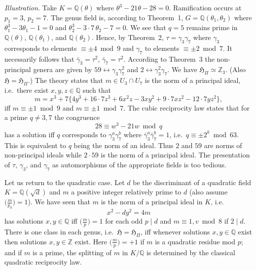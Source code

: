 \medskip\noindent
\emph{Illustration.} Take $K=\mathbb{Q}(\theta)$ where
$\theta^{3}-21\theta-28=0$. Ramification occurs at $p_{1}=3$,
$p_{2}=7$. The genus field is, according to Theorem~1,
$G=\mathbb{Q}(\theta_{1},\theta_{2})$ where $\theta_{1}^{3}-3\theta_{1}-1=0$
and $\theta_{2}^{3}-3\cdot 7\,\theta_{2}-7=0$. We see that $q=5$ remains
prime in $\mathbb{Q}(\theta)$, $\mathbb{Q}(\theta_{1})$, and
$\mathbb{Q}(\theta_{2})$. Hence, by Theorem~2, $\tau=\gamma_{3}\gamma_{7}$
where $\gamma_{3}$ corresponds to elements $\equiv\pm 4\bmod 9$ and
$\gamma_{7}$ to elements $\equiv\pm 2\bmod 7$. It necessarily follows
that $\bar{\gamma}_{3}=\tau^{2}$, $\bar{\gamma}_{7}=\tau^{2}$. According
to Theorem~3 the non-principal genera are given by
$59\leftrightarrow\gamma_{3}\gamma_{7}^{2}$ and
$2\leftrightarrow\gamma_{3}^{2}\gamma_{7}$. We have
$\mathfrak{H}_{\Pi}\simeq\mathbb{Z}_{3}$. (Also
$\mathfrak{H}=\mathfrak{H}_{\Pi}$.) The theory states that $m\in U_{3}\cap U_{7}$ is
the norm of a principal ideal, i.e.\ there exist $x,y,z\in\mathbb{Q}$
such that
\[
m=x^{3}+7\bigl\{4y^{3}+16\cdot 7z^{3}+6x^{2}z-3xy^{2}
+9\cdot 7xz^{2}-12\cdot 7yz^{2}\bigr\},
\]
iff $m\equiv\pm 1\bmod 9$ and $m\equiv\pm 1\bmod 7$. The cubic
reciprocity law states that for a prime $q\neq 3,7$ the congruence
\[
28\equiv w^{3}-21w\bmod q
\]
has a solution iff $q$ corresponds to $\gamma_{3}^{a}\gamma_{7}^{b}$
where $\bar{\gamma}_{3}^{a}\bar{\gamma}_{7}^{b}=1$, i.e.\
$q\equiv\pm 2^{k}\bmod 63$. This is equivalent to $q$ being the norm of
an ideal. Thus $2$ and $59$ are norms of non-principal ideals while
$2\cdot 59$ is the norm of a principal ideal. The presentation of $\tau$,
$\gamma_{3}$, and $\gamma_{7}$ as automorphisms of the appropriate fields
is too tedious.

\medskip

Let us return to the quadratic case. Let $d$ be the discriminant of a
quadratic field $K=\mathbb{Q}(\sqrt{d})$ and $m$ a positive integer
relatively prime to $d$ (also assume $\bigl(\frac{m}{p_{0}}\bigr)=1$).
We have seen that $m$ is the norm of a principal ideal in $K$, i.e.
\[
x^{2}-dy^{2}=4m
\]
has solutions $x,y\in\mathbb{Q}$ iff $\bigl(\frac{m}{p}\bigr)=1$ for each
odd $p\mid d$ and $m\equiv 1,v\bmod 8$ if $2\mid d$. There is one class
in each genus, i.e.\ $\mathfrak{H}=\mathfrak{H}_{\Pi}$, iff whenever
solutions $x,y\in\mathbb{Q}$ exist then solutions $x,y\in\mathbb{Z}$
exist. Here $\bigl(\frac{m}{p}\bigr)=+1$ if $m$ is a quadratic residue
mod $p$; and if $m$ is a prime, the splitting of $m$ in $K/\mathbb{Q}$ is
determined by the classical quadratic reciprocity law.


